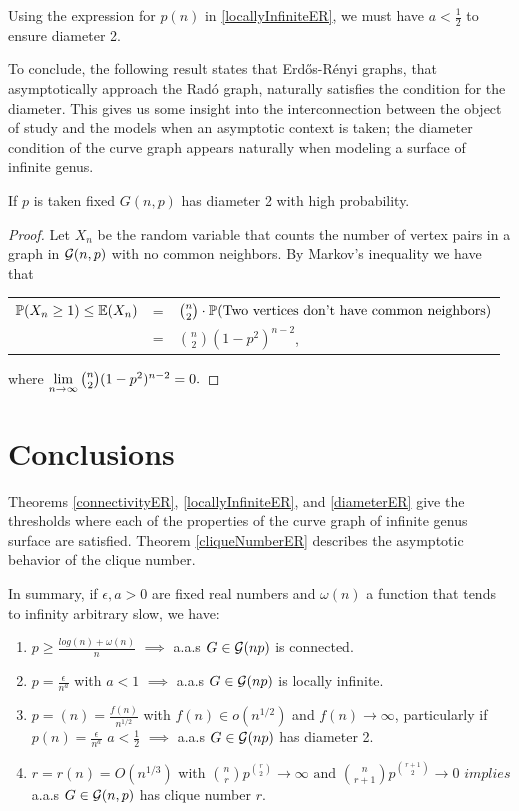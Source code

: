 Using the expression for $p(n)$ in \ref{locallyInfiniteER}, we must have $a<\frac{1}{2}$ to ensure diameter 2.

To conclude, the following result states that Erdős-Rényi graphs, that asymptotically approach the Radó graph, naturally satisfies the condition for the diameter. This gives us some insight into the interconnection between the object of study and the models when an asymptotic context is taken; the diameter condition of the curve graph appears naturally when modeling a surface of infinite genus.

\begin{theorem}
If $p$ is taken fixed $G(n,p)$ has diameter 2 with high probability.
\end{theorem}

\begin{proof}
Let $X_{n}$ be the random variable that counts the number of vertex pairs in a graph in $\G(n,p)$ with no common neighbors. By Markov's inequality we have that
\begin{center}
\begin{tabular}{ r c l }
 $\P(X_{n} \geq 1)\leq \E(X_{n})$ & = & $\binom{n}{2} \cdot \P(\text{Two vertices don't have common neighbors})$ \\
 & = & $\binom{n}{2} (1-p^{2})^{n-2}$,
\end{tabular}
\end{center}
where $\lim\limits_{n \to \infty}\binom{n}{2} (1-p^{2})^{n-2} = 0. \qedhere$
\end{proof}

\section{Conclusions}

Theorems \ref{connectivityER}, \ref{locallyInfiniteER}, and \ref{diameterER} give the thresholds where each of the properties of the curve graph of infinite genus surface are satisfied. Theorem \ref{cliqueNumberER} describes the asymptotic behavior of the clique number.

In summary, if $\epsilon, a > 0$ are fixed real numbers and $\omega(n)$ a function that tends to infinity arbitrary slow, we have:
\begin{enumerate}
    \item $p\geq \frac{log(n)+ \omega(n)}{n}$ $\implies$ a.a.s $G\in\G(np)$ is connected.
    \item $p=\frac{\epsilon}{n^{a}}$ with $a<1$ $\implies$ a.a.s $G\in\G(np)$ is locally infinite.
    \item $p=(n) = \frac{f(n)}{n^{1/2}}$ with $f(n)\in o(n^{1/2})$ and $f(n)\to \infty$, particularly if $p(n)=\frac{\epsilon}{n^{a}}$ $a<\frac{1}{2}$ $\implies$ a.a.s  $G\in\G(np)$ has diameter 2.
    \item $r = r(n) = O(n^{1/3})$ with $\binom{n}{r} p^{\binom{r}{2}} \to \infty \text{ and } \binom{n}{r+1} p^{\binom{r+1}{2}} \to 0 $ $implies$ a.a.s $G\in\G(n,p)$ has clique number $r$.
\end{enumerate}

